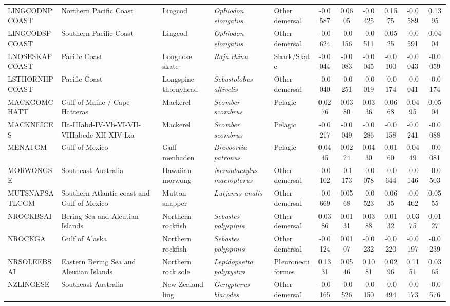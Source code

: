 \begin{longtable}{p{3cm}p{3cm}lllcccccc}
  LINGCODNPCOAST & Northern Pacific Coast & Lingcod & \textit{Ophiodon elongatus} & Other demersal & -0.0587 & 0.0605 & -0.0425 & 0.1575 & -0.0589 & 0.1395 \\
  LINGCODSPCOAST & Southern Pacific Coast & Lingcod & \textit{Ophiodon elongatus} & Other demersal & -0.0624 & -0.0156 & -0.0511 & 0.0525 & -0.0591 & 0.0404 \\
  LNOSESKAPCOAST & Pacific Coast & Longnose skate & \textit{Raja rhina} & Shark/Skate & -0.0044 & -0.0083 & -0.0045 & -0.0100 & -0.0043 & -0.0059 \\
  LSTHORNHPCOAST & Pacific Coast & Longspine thornyhead & \textit{Sebastolobus altivelis} & Other demersal & -0.0040 & -0.0251 & -0.0019 & -0.0174 & -0.0041 & -0.0174 \\
  MACKGOMCHATT & Gulf of Maine / Cape Hatteras & Mackerel & \textit{Scomber scombrus} & Pelagic & 0.0276 & 0.0380 & 0.0336 & 0.0668 & 0.0495 & 0.0504 \\
  MACKNEICES & IIa-IIIabd-IV-Vb-VI-VII-VIIIabcde-XII-XIV-Ixa & Mackerel & \textit{Scomber scombrus} & Pelagic & -0.0217 & -0.0049 & -0.0286 & -0.0158 & -0.0241 & -0.0088 \\
  MENATGM & Gulf of Mexico & Gulf menhaden & \textit{Brevoortia patronus} & Pelagic & 0.0445 & 0.0224 & 0.0430 & 0.0160 & 0.0449 & -0.0081 \\
  MORWONGSE & Southeast Australia & Hawaiian morwong & \textit{Nemadactylus macropterus} & Other demersal & -0.0102 & -0.1173 & -0.0078 & -0.0644 & -0.0146 & -0.0503 \\
  MUTSNAPSATLCGM & Southern Atlantic coast and Gulf of Mexico & Mutton snapper & \textit{Lutjanus analis} & Other demersal & -0.0669 & 0.0568 & -0.0523 & 0.0635 & -0.0462 & 0.0555 \\
  NROCKBSAI & Bering Sea and Aleutian Islands & Northern rockfish & \textit{Sebastes polyspinis} & Other demersal & 0.0386 & 0.0131 & 0.0388 & 0.0132 & 0.0375 & 0.0127 \\
  NROCKGA & Gulf of Alaska & Northern rockfish & \textit{Sebastes polyspinis} & Other demersal & -0.0124 & 0.0107 & -0.0232 & -0.0220 & -0.0197 & -0.0239 \\
  NRSOLEEBSAI & Eastern Bering Sea and Aleutian Islands & Northern rock sole & \textit{Lepidopsetta polyxystra} & Pleuronectiformes & 0.1331 & 0.0546 & 0.1081 & 0.0296 & 0.1151 & 0.0365 \\
  NZLINGESE & Southeast Australia & New Zealand ling & \textit{Genypterus blacodes} & Other demersal & -0.0165 & -0.0526 & -0.0150 & -0.0494 & -0.0173 & -0.0576 \\

\end{longtable}
